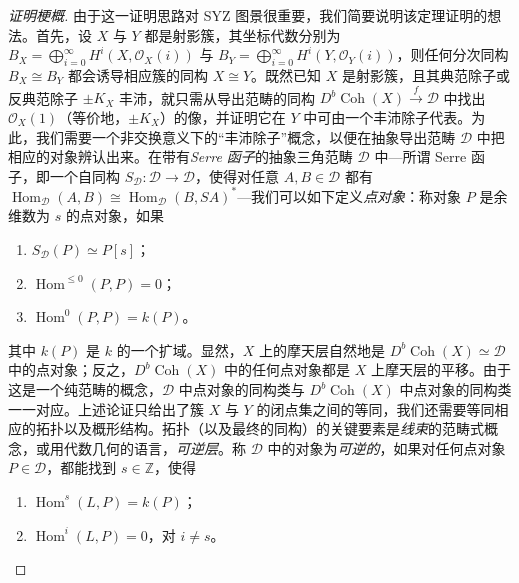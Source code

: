 \begin{proof}[证明梗概]
由于这一证明思路对 SYZ 图景很重要，我们简要说明该定理证明的想法。首先，设 $X$ 与 $Y$ 都是射影簇，其坐标代数分别为 $B_X=\bigoplus_{i=0}^{\infty}H^i(X,\mathcal{O}_X(i))$ 与 $B_Y=\bigoplus_{i=0}^{\infty}H^i(Y,\mathcal{O}_Y(i))$，则任何分次同构 $B_X\cong B_Y$ 都会诱导相应簇的同构 $X\cong Y$。既然已知 $X$ 是射影簇，且其典范除子或反典范除子 $\pm K_X$ 丰沛，就只需从导出范畴的同构 $D^b\operatorname{Coh}(X)\xrightarrow{f}\mathcal{D}$ 中找出 $\mathcal{O}_X(1)$（等价地，$\pm K_X$）的像，并证明它在 $Y$ 中可由一个丰沛除子代表。为此，我们需要一个非交换意义下的“丰沛除子”概念，以便在抽象导出范畴 $\mathcal{D}$ 中把相应的对象辨认出来。在带有\emph{Serre 函子}的抽象三角范畴 $\mathcal{D}$ 中---所谓 Serre 函子，即一个自同构 $S_{\mathcal{D}}\colon\mathcal{D}\to\mathcal{D}$，使得对任意 $A,B\in\mathcal{D}$ 都有 $\operatorname{Hom}_{\mathcal{D}}(A,B)\cong\operatorname{Hom}_{\mathcal{D}}(B,SA)^{\ast}$---我们可以如下定义\emph{点对象}：称对象 $P$ 是余维数为 $s$ 的点对象，如果
\begin{enumerate}[label=\roman*.,leftmargin=1.9em,itemsep=1pt,topsep=2pt]
  \item $S_{\mathcal{D}}(P)\simeq P[s]$；
  \item $\operatorname{Hom}^{\leq 0}(P,P)=0$；
  \item $\operatorname{Hom}^0(P,P)=k(P)$。
\end{enumerate}


其中 $k(P)$ 是 $k$ 的一个扩域。显然，$X$ 上的摩天层自然地是 $D^b\operatorname{Coh}(X)\simeq\mathcal{D}$ 中的点对象；反之，$D^b\operatorname{Coh}(X)$ 中的任何点对象都是 $X$ 上摩天层的平移。由于这是一个纯范畴的概念，$\mathcal{D}$ 中点对象的同构类与 $D^b\operatorname{Coh}(X)$ 中点对象的同构类一一对应。上述论证只给出了簇 $X$ 与 $Y$ 的闭点集之间的等同，我们还需要等同相应的拓扑以及概形结构。拓扑（以及最终的同构）的关键要素是\emph{线束}的范畴式概念，或用代数几何的语言，\emph{可逆层}。称 $\mathcal{D}$ 中的对象为\emph{可逆的}，如果对任何点对象 $P\in\mathcal{D}$，都能找到 $s\in\mathbb{Z}$，使得
\begin{enumerate}[label=\roman*.,leftmargin=1.9em,itemsep=1pt,topsep=2pt]
  \item $\operatorname{Hom}^s(L,P)=k(P)$；
  \item $\operatorname{Hom}^i(L,P)=0$，对 $i\neq s$。
\end{enumerate}


\end{proof}
